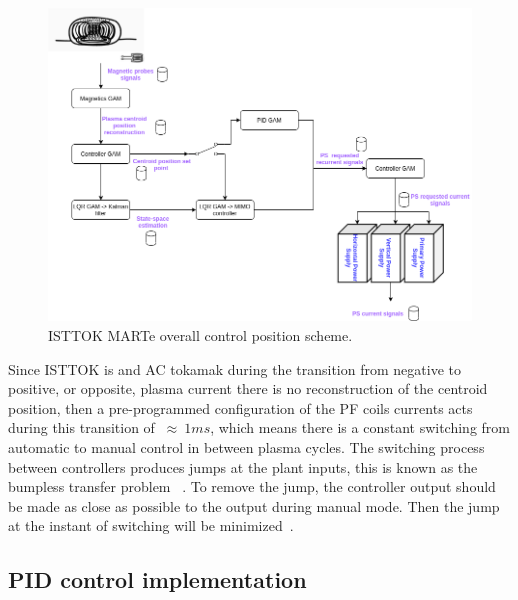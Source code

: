 \begin{figure}[h]
	\centering
	\includegraphics[width=1.0\textwidth]{Chp5/GAMsDiagram_1.png}	
	\caption{ISTTOK MARTe overall control position  scheme. \label{GAMsDiags}}
\end{figure}

Since ISTTOK is and AC tokamak during the transition from negative to positive, or opposite, plasma current there is no reconstruction of the centroid position, then a pre-programmed configuration of the  PF coils currents acts during this transition of $~\approx~1ms$, which means there is a constant switching from automatic to manual control in between plasma cycles. The switching process between controllers produces jumps at the plant inputs, this is known as the bumpless transfer problem ~\cite[Chapter~8]{Hippe2011}. To remove the jump, the controller output  should be made as close as possible to the output during manual mode. Then the jump at the instant of switching will be minimized~\cite{Vrancic1996}.   

\subsection{PID control implementation}

